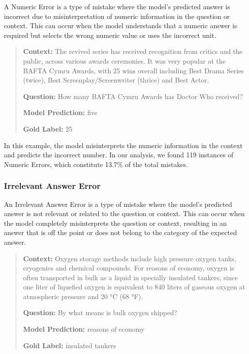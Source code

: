 \documentclass{article}
\begin{document}
A Numeric Error is a type of mistake where the model's
predicted answer is incorrect due to misinterpretation of numeric information
in the question or context. This can occur when the model understands that a
numeric answer is required but selects the wrong numeric value or uses the
incorrect unit.

\begin{quote}
\textbf{Context:} The revived series has received recognition from critics
and the public, across various awards ceremonies. It was very popular at the
BAFTA Cymru Awards, with 25 wins overall including Best Drama Series (twice),
Best Screenplay/Screenwriter (thrice) and Best Actor.

\textbf{Question:} How many BAFTA Cymru Awards has Doctor Who received?

\textbf{Model Prediction:} five

\textbf{Gold Label:} 25
\end{quote}

In this example, the model misinterprets the numeric information in the context
and predicts the incorrect number. In our analysis, we found 119 instances of
Numeric Errors, which constitute 13.7\% of the total mistakes.

\subsubsection*{Irrelevant Answer Error}

An Irrelevant Answer Error is a type of mistake where the model's predicted
answer is not relevant or related to the question or context. This can occur
when the model completely misinterprets the question or context, resulting in
an answer that is off the point or does not belong to the category of the
expected answer.

\begin{quote}
\textbf{Context:} Oxygen storage methods include high pressure oxygen tanks,
cryogenics and chemical compounds. For reasons of economy, oxygen is often
transported in bulk as a liquid in specially insulated tankers, since one liter
of liquefied oxygen is equivalent to 840 liters of gaseous oxygen at atmospheric
pressure and 20 °C (68 °F).

\textbf{Question:} By what means is bulk oxygen shipped?

\textbf{Model Prediction:} reasons of economy

\textbf{Gold Label:} insulated tankers
\end{quote}
\end{document}
